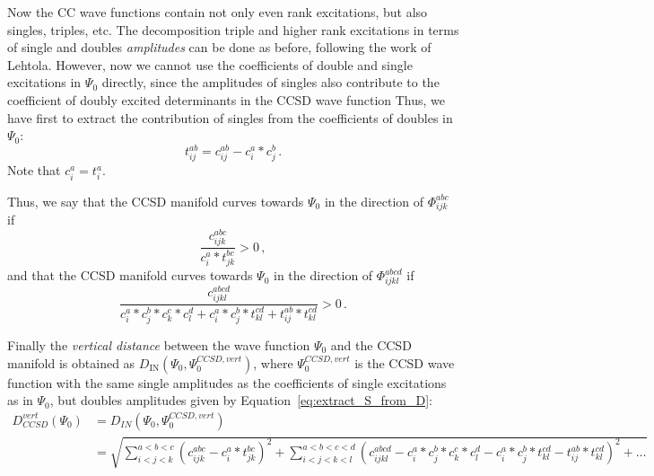 Now the CC wave functions contain not only even rank excitations,
but also singles, triples, etc.
The decomposition triple and higher rank excitations in terms of single and doubles \emph{amplitudes}
can be done as before, following the work of Lehtola.
However, now we cannot use the coefficients of double and single excitations in $\Psi_0$
directly, since the amplitudes of singles also contribute to the coefficient of doubly excited
determinants in the CCSD wave function
Thus, we have first to extract the contribution of singles
from the coefficients of doubles in $\Psi_0$:
\begin{equation}\label{eq:extract_S_from_D}
  t_{ij}^{ab} = c_{ij}^{ab} - c_i^a * c_j^b\,.
\end{equation}
Note that $c_i^a = t_i^a$.

Thus, we say that the CCSD manifold curves towards $\Psi_0$ in the direction of
$\Phi_{ijk}^{abc}$ if
\begin{equation}
  \frac{c_{ijk}^{abc}}{c_{i}^{a} * t_{jk}^{bc}} > 0\,,
\end{equation}
and that the CCSD manifold curves towards $\Psi_0$ in the direction of
$\Phi_{ijkl}^{abcd}$ if
\begin{equation}
  \frac{c_{ijkl}^{abcd}}
  {c_{i}^{a} * c_{j}^{b} * c_{k}^{c} * c_{l}^{d}
    + c_{i}^{a} * c_{j}^{b} * t_{kl}^{cd}
    + t_{ij}^{ab} * t_{kl}^{cd}} > 0\,.
\end{equation}

Finally the \emph{vertical distance} between the wave function $\Psi_0$
and the CCSD manifold is obtained as
$D_\text{IN}(\Psi_0, \Psi_0^{CCSD,vert})$, where $\Psi_0^{CCSD,vert}$ is the CCSD wave function
with the same single amplitudes as the coefficients of single excitations as in $\Psi_0$,
but doubles amplitudes given by Equation~\eqref{eq:extract_S_from_D}:
\begin{equation}
  \begin{split}
    D_{CCSD}^{vert}(\Psi_0) &= 
    D_{IN}(\Psi_0, \Psi_0^{CCSD,vert})\\
    &= \sqrt{
      \sum_{i<j<k}^{a<b<c}
      (c_{ijk}^{abc} - c_{i}^{a} * t_{jk}^{bc})^2
      + \sum_{i<j<k<l}^{a<b<c<d}
      (c_{ijkl}^{abcd}
      - c_{i}^{a} * c_{j}^{b} * c_{k}^{c} * c_{l}^{d}
      - c_{i}^{a} * c_{j}^{b} * t_{kl}^{cd}
      - t_{ij}^{ab} * t_{kl}^{cd})^2 + \dots
    }
  \end{split}
\end{equation}





